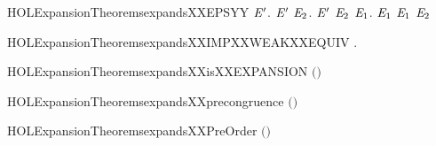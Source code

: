 \begin{SaveVerbatim}{HOLExpansionTheoremsexpandsXXEPSYY}
\HOLTokenTurnstile{} \HOLSymConst{\HOLTokenForall{}} \ensuremath{\HOLBoundVar{E}\sp{\prime}}.
         \ensuremath{\HOLBoundVar{E}\sp{\prime}} \HOLSymConst{\HOLTokenImp{}}
       \HOLSymConst{\HOLTokenForall{}}\ensuremath{\HOLBoundVar{E}\sb{\mathrm{2}}}.  \ensuremath{\HOLBoundVar{E}\sp{\prime}} \ensuremath{\HOLBoundVar{E}\sb{\mathrm{2}}} \HOLSymConst{\HOLTokenImp{}} \HOLSymConst{\HOLTokenExists{}}\ensuremath{\HOLBoundVar{E}\sb{\mathrm{1}}}.   \ensuremath{\HOLBoundVar{E}\sb{\mathrm{1}}} \HOLSymConst{\HOLTokenConj{}} \ensuremath{\HOLBoundVar{E}\sb{\mathrm{1}}}  \ensuremath{\HOLBoundVar{E}\sb{\mathrm{2}}}
\end{SaveVerbatim}
\newcommand{\HOLExpansionTheoremsexpandsXXEPSYY}{\UseVerbatim{HOLExpansionTheoremsexpandsXXEPSYY}}
\begin{SaveVerbatim}{HOLExpansionTheoremsexpandsXXIMPXXWEAKXXEQUIV}
\HOLTokenTurnstile{} \HOLSymConst{\HOLTokenForall{}} .    \HOLSymConst{\HOLTokenImp{}}   
\end{SaveVerbatim}
\newcommand{\HOLExpansionTheoremsexpandsXXIMPXXWEAKXXEQUIV}{\UseVerbatim{HOLExpansionTheoremsexpandsXXIMPXXWEAKXXEQUIV}}
\begin{SaveVerbatim}{HOLExpansionTheoremsexpandsXXisXXEXPANSION}
\HOLTokenTurnstile{}  \ensuremath{(}\ensuremath{)}
\end{SaveVerbatim}
\newcommand{\HOLExpansionTheoremsexpandsXXisXXEXPANSION}{\UseVerbatim{HOLExpansionTheoremsexpandsXXisXXEXPANSION}}
\begin{SaveVerbatim}{HOLExpansionTheoremsexpandsXXprecongruence}
\HOLTokenTurnstile{}  \ensuremath{(}\ensuremath{)}
\end{SaveVerbatim}
\newcommand{\HOLExpansionTheoremsexpandsXXprecongruence}{\UseVerbatim{HOLExpansionTheoremsexpandsXXprecongruence}}
\begin{SaveVerbatim}{HOLExpansionTheoremsexpandsXXPreOrder}
\HOLTokenTurnstile{}  \ensuremath{(}\ensuremath{)}
\end{SaveVerbatim}
\newcommand{\HOLExpansionTheoremsexpandsXXPreOrder}{\UseVerbatim{HOLExpansionTheoremsexpandsXXPreOrder}}
